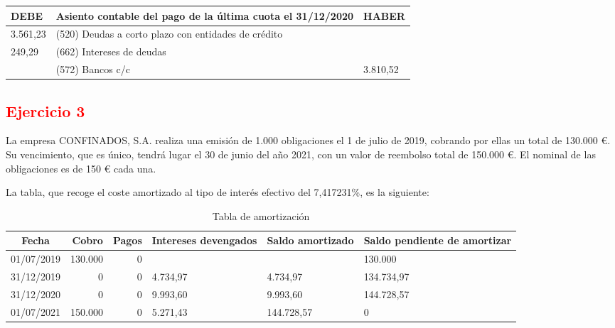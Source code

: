 \begin{table}[H]
\centering
\begin{tabular}{|p{2cm}|p{8cm}|p{2cm}|}
\hline
\rowcolor{blue!30}
\textbf{DEBE} & \textbf{Asiento contable del pago de la última cuota el 31/12/2020} & \textbf{HABER} \\ \hline
3.561,23 & (520) Deudas a corto plazo con entidades de crédito & \\ \hline
249,29 & (662) Intereses de deudas & \\ \hline
& (572) Bancos c/c & 3.810,52 \\ \hline
\end{tabular}
\end{table}

\newpage
\subsection*{\textcolor{red}{Ejercicio 3}}

La empresa CONFINADOS, S.A. realiza una emisión de 1.000 obligaciones el 1 de julio de 2019, cobrando por ellas un total de 130.000 €. Su vencimiento, que es único, tendrá lugar el 30 de junio del año 2021, con un valor de reembolso total de 150.000 €. El nominal de las obligaciones es de 150 € cada una.

La tabla, que recoge el coste amortizado al tipo de interés efectivo del 7,417231\%, es la siguiente:

\begin{table}[h]
    \centering
    \renewcommand{\arraystretch}{1.2}
    \begin{tabular}{|c|r|r|p{2cm}|p{2cm}|p{2cm}|}
        \hline
        \textbf{Fecha} & \textbf{Cobro} & \textbf{Pagos} & \textbf{Intereses devengados} & \textbf{Saldo amortizado} & \textbf{Saldo pendiente de amortizar} \\
        \hline
        01/07/2019 & 130.000 & 0 &  &  & 130.000 \\
        31/12/2019 & 0 & 0 & 4.734,97 & 4.734,97 & 134.734,97 \\
        31/12/2020 & 0 & 0 & 9.993,60 & 9.993,60 & 144.728,57 \\
        01/07/2021 & 150.000 & 0 & 5.271,43 & 144.728,57 & 0 \\
        \hline
    \end{tabular}
    \caption{Tabla de amortización}
    \label{tab:amortizacion}
\end{table}


